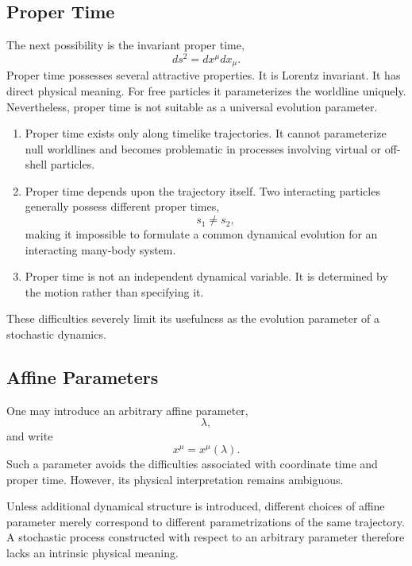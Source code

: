 \subsection{Proper Time}
The next possibility is the invariant proper time,
\[ds^2=dx^\mu dx_\mu.\]
Proper time possesses several attractive properties.
It is Lorentz invariant.
It has direct physical meaning.
For free particles it parameterizes the worldline uniquely.
Nevertheless, proper time is not suitable as a universal evolution
parameter.
\begin{enumerate}
   \item
    Proper time exists only along timelike trajectories. It cannot
    parameterize null worldlines and becomes problematic in processes
    involving virtual or off-shell particles.
   \item
    Proper time depends upon the trajectory itself. Two interacting
    particles generally possess different proper times,
    \[s_1 \neq s_2,\]
    making it impossible to formulate a common dynamical evolution for an
    interacting many-body system.
   \item
    Proper time is not an independent dynamical variable. It is
    determined by the motion rather than specifying it.
\end{enumerate}
These difficulties severely limit its usefulness as the evolution
parameter of a stochastic dynamics.
\subsection{Affine Parameters}
One may introduce an arbitrary affine parameter,
\[\lambda,\]
and write
\[x^\mu=x^\mu(\lambda).\]
Such a parameter avoids the difficulties associated with coordinate time
and proper time.
However, its physical interpretation remains ambiguous.

Unless additional dynamical structure is introduced, different choices
of affine parameter merely correspond to different parametrizations of
the same trajectory.
A stochastic process constructed with respect to an arbitrary parameter
therefore lacks an intrinsic physical meaning.
